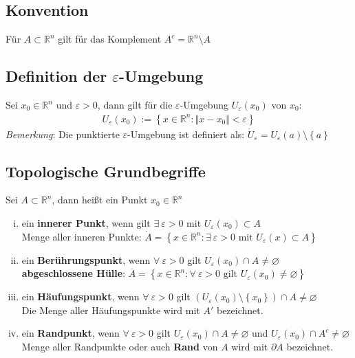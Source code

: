 \documentclass[11pt,a4paper]{book}
\newcommand {\Rn}	{\mathbb{R}^n}
\newcommand{\1}    	{\mathbbm{1}}
\newcommand{\Bemerkung}	{\noindent\textit{Bemerkung}: }
\begin{document}
\subsection{Konvention}
Für \(A \subset \Rn\) gilt für das Komplement \(A^c = \Rn \setminus A\)

\subsection{Definition der \(\varepsilon\)-Umgebung}
Sei \(x_0 \in \Rn\) und \(\varepsilon > 0\), dann gilt für die \(\varepsilon\)-Umgebung \(U_\varepsilon(x_0)\) von \(x_0\):
\begin{align*}
	U_\varepsilon(x_0) := \left\{ x \in \Rn : \Vert x - x_0 \Vert < \varepsilon \right\}
\end{align*}
\Bemerkung Die punktierte \(\varepsilon\)-Umgebung ist definiert als: \( \dot{U}_\varepsilon = U_\varepsilon (a) \setminus \left\{ a \right\} \)

\subsection{Topologische Grundbegriffe}
Sei \(A \subset \Rn\), dann heißt ein Punkt \(x_0 \in \Rn\)
\begin{enumerate}[(i)]
	\item ein \textbf{innerer Punkt}, wenn gilt \(\exists~ \varepsilon > 0\) mit \(U_\varepsilon(x_0) \subset A\) \\
	Menge aller inneren Punkte: \( \mathring{A} = \left\{ x \in \Rn : \exists~ \varepsilon > 0 \textrm{ mit } U_\varepsilon(x) \subset A \right\} \)
	\item ein \textbf{Berührungspunkt}, wenn \(\forall~ \varepsilon > 0\) gilt \(U_\varepsilon (x_0) \cap A \neq \varnothing \) \\
	\textbf{abgeschlossene Hülle}: \(\overline{A} = \left\{ x \in \Rn : \forall~ \varepsilon > 0 \textrm{ gilt } U_\varepsilon(x_0) \neq \varnothing \right\} \)
	\item ein \textbf{Häufungspunkt}, wenn \(\forall~ \varepsilon > 0\) gilt \( \left( U_\varepsilon(x_0) \setminus \left\{ x_0 \right\} \right) \cap A \neq \varnothing \) \\
	Die Menge aller Häufungspunkte wird mit \(A'\) bezeichnet.
	\item ein \textbf{Randpunkt}, wenn \(\forall~ \varepsilon > 0\) gilt \( U_\varepsilon(x_0) \cap A \neq \varnothing\) und \( U_\varepsilon(x_0) \cap A^c \neq \varnothing\) \\
	Menge aller Randpunkte oder auch \textbf{Rand} von \(A\) wird mit \(\partial A \) bezeichnet.
\end{enumerate}
\end{document}
